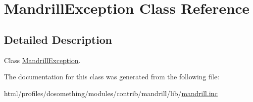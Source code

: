 \hypertarget{classMandrillException}{
\section{MandrillException Class Reference}
\label{classMandrillException}
}


\subsection{Detailed Description}
Class \hyperlink{classMandrillException}{MandrillException}. 

The documentation for this class was generated from the following file:\begin{DoxyCompactItemize}
\item 
html/profiles/dosomething/modules/contrib/mandrill/lib/\hyperlink{mandrill_8inc}{mandrill.inc}\end{DoxyCompactItemize}
